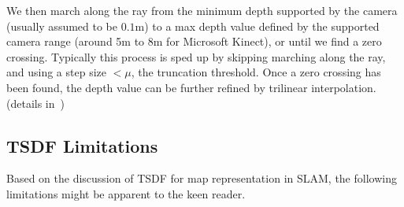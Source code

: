 We then march along the ray from the minimum depth supported by the camera (usually assumed to be $0.1$m) to a max depth value defined by the supported camera range (around 5m to 8m for Microsoft Kinect), or until we find a zero crossing. Typically this process is sped up by skipping marching along the ray, and using a step size $< \mu$, the truncation threshold. Once a zero crossing has been found, the depth value can be further refined by trilinear interpolation. (details in~\cite{newcombeKinectFusionRealtimeDense2011})

\subsection{TSDF Limitations}

Based on the discussion of TSDF for map representation in SLAM, the following limitations might be apparent to the keen reader.
